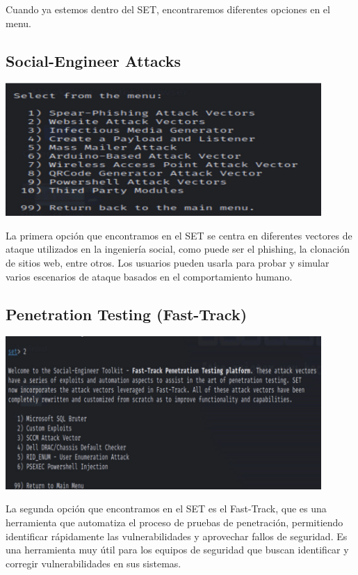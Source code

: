 \documentclass[12pt]{article}
\begin{document}
\newpage
\noindent
Cuando ya estemos dentro del SET, encontraremos diferentes opciones en el menu.

\subsection{Social-Engineer Attacks}
\begin{center}
    \includegraphics[width=12cm]{sav.png}
\end{center}

\noindent
La primera opción que encontramos en el SET se centra en diferentes vectores de ataque utilizados en la ingeniería social, como puede ser el phishing, la clonación de sitios web, entre otros. Los usuarios pueden usarla para probar y simular varios escenarios de ataque basados en el comportamiento humano.

\subsection{Penetration Testing (Fast-Track)}

\begin{center}
    \includegraphics[width=12cm]{pt.png}
\end{center}

\noindent
La segunda opción que encontramos en el SET es el Fast-Track, que es una herramienta que automatiza el proceso de pruebas de penetración, permitiendo identificar rápidamente las vulnerabilidades y aprovechar fallos de seguridad. Es una herramienta muy útil para los equipos de seguridad que buscan identificar y corregir vulnerabilidades en sus sistemas.
\end{document}
